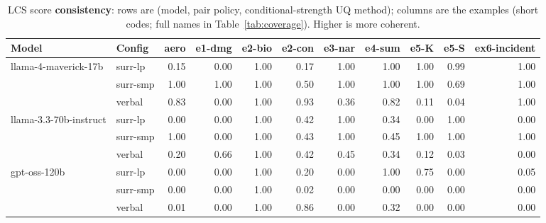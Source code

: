 \documentclass[11pt]{article}
\begin{document}
\begin{table}[htbp]
\centering
\footnotesize
\setlength{\tabcolsep}{3.5pt}
\caption{LCS score \textbf{consistency}: rows are (model, pair policy, conditional-strength UQ method); columns are the examples (short codes; full names in Table~\ref{tab:coverage}). Higher is more coherent.}
\label{tab:consistency}
\begin{tabular}{llrrrrrrrrr}
\toprule
\textbf{Model} & \textbf{Config} & \textbf{aero} & \textbf{e1-dmg} & \textbf{e2-bio} & \textbf{e2-con} & \textbf{e3-nar} & \textbf{e4-sum} & \textbf{e5-K} & \textbf{e5-S} & \textbf{ex6-incident} \\
\midrule
llama-4-maverick-17b & surr-lp & 0.15 & 0.00 & 1.00 & 0.17 & 1.00 & 1.00 & 1.00 & 0.99 & 1.00 \\
 & surr-smp & 1.00 & 1.00 & 1.00 & 0.50 & 1.00 & 1.00 & 1.00 & 0.69 & 1.00 \\
 & verbal & 0.83 & 0.00 & 1.00 & 0.93 & 0.36 & 0.82 & 0.11 & 0.04 & 1.00 \\
\midrule
llama-3.3-70b-instruct & surr-lp & 0.00 & 0.00 & 1.00 & 0.42 & 1.00 & 0.34 & 0.00 & 1.00 & 0.00 \\
 & surr-smp & 1.00 & 0.00 & 1.00 & 0.43 & 1.00 & 0.45 & 1.00 & 1.00 & 1.00 \\
 & verbal & 0.20 & 0.66 & 1.00 & 0.42 & 0.45 & 0.34 & 0.12 & 0.03 & 0.00 \\
\midrule
gpt-oss-120b & surr-lp & 0.00 & 0.00 & 1.00 & 0.20 & 0.00 & 1.00 & 0.75 & 0.00 & 0.05 \\
 & surr-smp & 0.00 & 0.00 & 1.00 & 0.02 & 0.00 & 0.00 & 0.00 & 0.00 & 0.00 \\
 & verbal & 0.01 & 0.00 & 1.00 & 0.86 & 0.00 & 0.32 & 0.00 & 0.00 & 0.00 \\
\bottomrule
\end{tabular}
\end{table}
\end{document}
